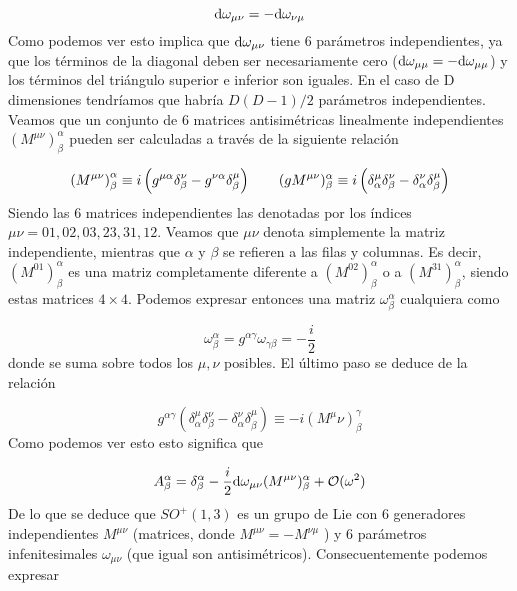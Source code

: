 \begin{equation}
	\mathrm{d} \omega_{\mu \nu} = - \mathrm{d} \omega_{\nu \mu}
\end{equation}
Como podemos ver esto implica que $\mathrm{d} \omega_{\mu \nu}$ tiene 6 parámetros independientes, ya que los términos de la diagonal deben ser necesariamente cero ($\mathrm{d} \omega_{\mu \mu}=-\mathrm{d} \omega_{\mu \mu}$) y los términos del triángulo superior e inferior son iguales. En el caso de D dimensiones tendríamos que habría $D(D-1)/2$ parámetros independientes. Veamos que un conjunto de 6 matrices antisimétricas linealmente independientes $(M^{\mu \nu})^{\alpha}_{\beta}$ pueden ser calculadas a través de la siguiente relación

\begin{equation}
	\left( M^{\mu \nu} \right)   ^\alpha_\beta \equiv i \left( g^{\mu \alpha} \delta^\nu_\beta - g^{\nu \alpha} \delta^\mu_\beta \right) \qquad (gM^{\mu \nu})^\alpha_\beta \equiv i \left( \delta^\mu_\alpha \delta^\nu_\beta - \delta^\nu_\alpha \delta^\mu_\beta \right)
\end{equation}
Siendo las 6 matrices independientes las denotadas por los índices $\mu \nu=01,02,03,23,31,12$. Veamos que $\mu \nu$ denota simplemente la matriz independiente, mientras que $\alpha$ y $\beta$ se refieren a las filas y columnas. Es decir, $(M^{01})^\alpha_\beta$ es una matriz completamente diferente a $(M^{02})^\alpha_\beta$ o a $(M^{31})^\alpha_\beta$, siendo estas matrices $4\times4$. Podemos expresar entonces una matriz $\omega^\alpha_\beta$ cualquiera como

\begin{equation}
	\omega^\alpha_\beta = g^{\alpha \gamma} \omega_{\gamma \beta} = -\frac{i}{2}
\end{equation}
donde se suma sobre todos los $\mu,\nu$ posibles. El último paso se deduce de la relación

\begin{equation}
	g^{\alpha \gamma} (\delta^\mu_\alpha \delta^\nu_\beta -  \delta^\nu_\alpha \delta^\mu_\beta) \equiv - i (M^\mu \nu)^\gamma_\beta
\end{equation}
Como podemos ver esto esto significa que

\begin{equation}
	A^\alpha_\beta = \delta^\alpha_\beta - \frac{i}{2} \mathrm{d} \omega_{\mu \nu} (M^{\mu \nu})^\alpha_\beta + \mathcal{O}(\omega^2)
\end{equation}
De lo que se deduce que $SO^+(1,3)$ es un grupo de Lie con 6 generadores independientes $M^{\mu \nu}$ (matrices, donde $M^{\mu \nu}=-M^{\nu \mu}$ ) y 6 parámetros infenitesimales $\omega_{\mu \nu}$ (que igual son antisimétricos). Consecuentemente podemos expresar

